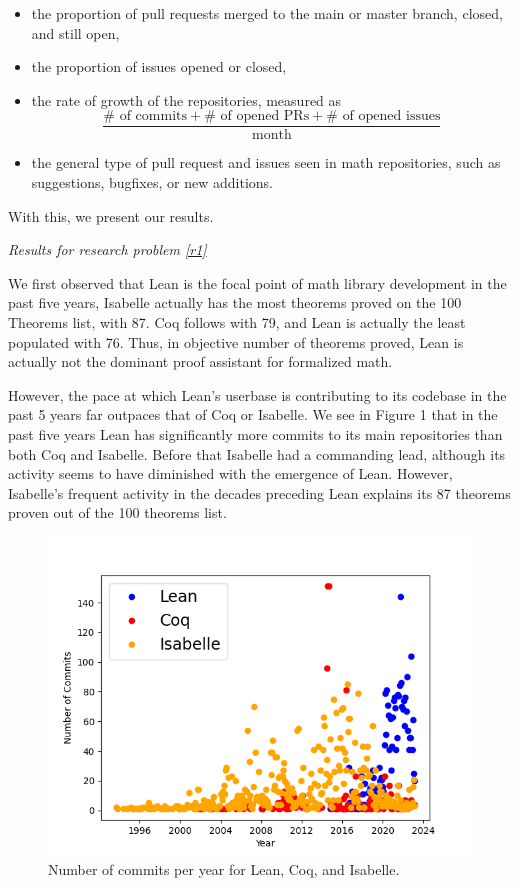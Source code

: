 \documentclass[sigconf,nonacm]{acmart}
\begin{document}
\begin{itemize}
  \item the proportion of pull requests merged to the main or master branch, closed, and still open,
  \item the proportion of issues opened or closed,
  \item the rate of growth of the repositories, measured as
  \begin{equation}
    \frac{\#\text{ of commits}+\#\text{ of opened PRs}+\#\text{ of opened issues}}{\text{month}}
  \end{equation} 
  \item the general type of pull request and issues seen in math repositories, such as suggestions, bugfixes, or new additions.
\end{itemize}

With this, we present our results.

\textit{Results for research problem \ref{r1}}

We first observed that Lean is the focal point of math library development in the past five years, Isabelle actually has the most theorems proved on the 100 Theorems list, with 87. Coq follows with 79, and Lean is actually the least populated with 76. Thus, in objective number of theorems proved, Lean is actually not the dominant proof assistant for formalized math. 

However, the pace at which Lean's userbase is contributing to its codebase in the past 5 years far outpaces that of Coq or Isabelle. We see in Figure 1 that in the past five years Lean has significantly more commits to its main repositories than both Coq and Isabelle. Before that Isabelle had a commanding lead, although its activity seems to have diminished with the emergence of Lean. However, Isabelle's frequent activity in the decades preceding Lean explains its 87 theorems proven out of the 100 theorems list.

\begin{figure}[H]
  \includegraphics[scale=0.5]{compare_commits.png}
  \caption{Number of commits per year for Lean, Coq, and Isabelle.}
\end{figure}
\end{document}
